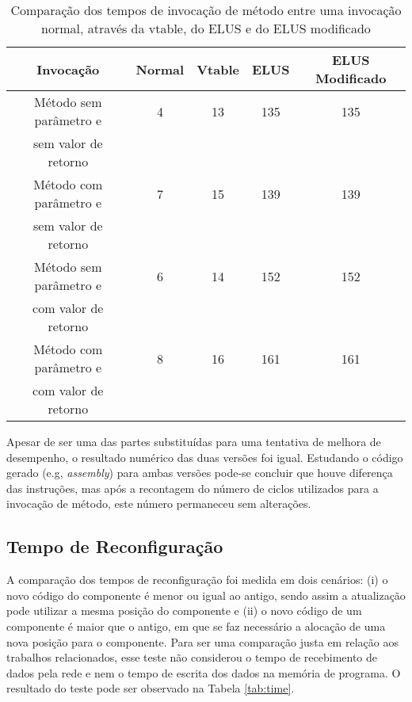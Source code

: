 \documentclass[12pt]{article}
\begin{document}
\begin{table}[!th]
\caption{Comparação dos tempos de invocação de método entre uma invocação normal, através da vtable, do ELUS e do ELUS modificado}
\begin{center}
\begin{tabular}{| c | c | c | c | c |}
\hline 
	\textbf{Invocação}       	& \textbf{Normal} & \textbf{Vtable} & \textbf{ELUS} & \textbf{ELUS Modificado} \\ \hline
	Método sem parâmetro e      & 4 & 13 & 135 & 135\\
	sem valor de retorno		&&&&	\\ \hline
	Método com parâmetro e      & 7 & 15 & 139 & 139\\
	sem valor de retorno 		&&&&	\\ \hline
	Método sem parâmetro e      & 6 & 14 & 152 & 152\\
	com valor de retorno 		&&&&	\\ \hline
	Método com parâmetro e      & 8 & 16 & 161 & 161\\
	com valor de retorno 		&&&&	\\ \hline
\end{tabular}
\label{tab:resultado_invocacao_metodo} 
\end{center}
\end{table}

Apesar de ser uma das partes substituídas para uma tentativa de melhora de desempenho, o resultado numérico das duas versões foi igual. Estudando o código gerado (e.g, \textit{assembly}) para ambas versões pode-se concluir que houve diferença das instruções, mas após a recontagem do número de ciclos utilizados para a invocação de método, este número permaneceu sem alterações.

\subsection{Tempo de Reconfiguração}
A comparação dos tempos de reconfiguração foi medida em dois cenários: (i) o novo código do componente é menor ou igual ao antigo, sendo assim a atualização pode utilizar a mesma posição do componente e (ii) o novo código de um componente é maior que o antigo, em que se faz necessário a alocação de uma nova posição para o componente. Para ser uma comparação justa em relação aos trabalhos relacionados, esse teste não considerou o tempo de recebimento de dados pela rede e nem o tempo de escrita dos dados na memória de programa. O resultado do teste pode ser observado na Tabela \ref{tab:time}.
\end{document}

